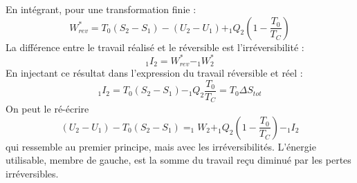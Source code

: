 		En intégrant, pour une transformation finie :
		\begin{equation}
		W_{rev}^* =T_0(S_2-S_1) - (U_2-U_1) + _1Q_2\left(1-\dfrac{T_0}{T_C}\right)
		\end{equation}
		La différence entre le travail réalisé et le réversible est l'irréversibilité :
		\begin{equation}
		_1I_2 = W_{rev}^* - _1W_2^*
		\end{equation}
		En injectant ce résultat dans l'expression du travail réversible et réel :
		\begin{equation}
		_1I_2 = T_0(S_2-S_1)-_1Q_2\dfrac{T_0}{T_C} = T_0\Delta S_{tot}
		\end{equation}
		On peut le ré-écrire 
		\begin{equation}
		(U_2-U_1) - T_0(S_2-S_1) = _1W_2 + _1Q_2\left(1-\dfrac{T_0}{T_C}\right)-_1I_2
		\end{equation}
		qui ressemble au premier principe, mais avec les irréversibilités. L'énergie 
		utilisable, membre de gauche, est la somme du travail reçu diminué par les 
		pertes irréversibles.
		
